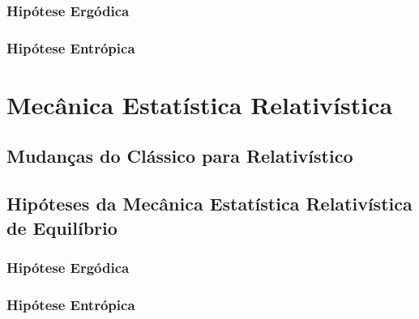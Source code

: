\documentclass[twoside]{amsart}
\numberwithin{equation}{section}
\begin{document}
\subsubsection{Hipótese Ergódica}

\subsubsection{Hipótese Entrópica}



\section{Mecânica Estatística Relativística}

\subsection{Mudanças do Clássico para Relativístico}

\subsection{Hipóteses da Mecânica Estatística Relativística de Equilíbrio}

\subsubsection{Hipótese Ergódica}

\subsubsection{Hipótese Entrópica}


\end{document}
